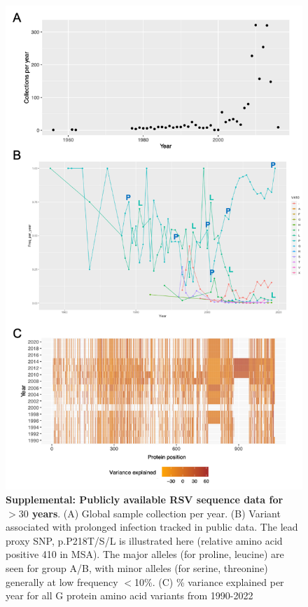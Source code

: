 \documentclass{article} %
\begin{document}
\begin{figure}[ht] \hspace{-0.5cm} \begin{center}
    \includegraphics[scale=0.6]{S2}
	\caption{\textbf{Supplemental: Publicly available RSV sequence data for $>30$ years}. (A) Global sample collection per year. (B) Variant associated with prolonged infection tracked in public data. 
	The lead proxy SNP, p.P218T/S/L is illustrated here (relative amino acid positive 410 in MSA). The major alleles (for proline, leucine) are seen for group A/B, with minor alleles (for serine, threonine) generally at low frequency $<$10\%.
	(C) \% variance explained per year for all G protein amino acid variants from 1990-2022} 
	\label{fig:S2} \end{center}
\end{figure}
\end{document}
